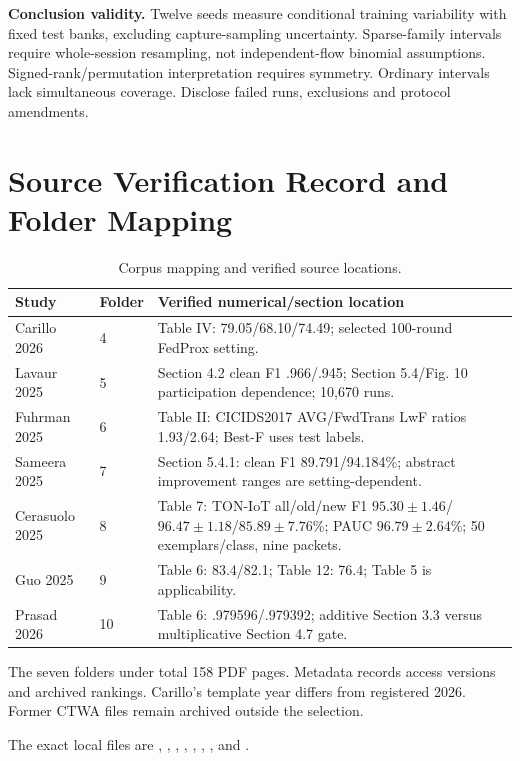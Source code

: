 \documentclass[10pt,a4paper]{article}
\begin{document}
\textbf{Conclusion validity.} Twelve seeds measure conditional training variability with fixed test banks, excluding capture-sampling uncertainty. Sparse-family intervals require whole-session resampling, not independent-flow binomial assumptions. Signed-rank/permutation interpretation requires symmetry. Ordinary intervals lack simultaneous coverage. Disclose failed runs, exclusions and protocol amendments.

\appendix
\section{Source Verification Record and Folder Mapping}
\label{app:sources}
\begin{table}[htbp]
\centering\footnotesize
\caption{Corpus mapping and verified source locations.}
\label{tab:mapping}
\begin{tabularx}{\linewidth}{L{2.4cm}L{1.0cm}Y}
\toprule
Study & Folder & Verified numerical/section location\\
\midrule
Carillo 2026 & 4 & Table IV: 79.05/68.10/74.49; selected 100-round FedProx setting.\\
Lavaur 2025 & 5 & Section 4.2 clean F1 .966/.945; Section 5.4/Fig. 10 participation dependence; 10,670 runs.\\
Fuhrman 2025 & 6 & Table II: CICIDS2017 AVG/FwdTrans LwF ratios 1.93/2.64; Best-F uses test labels.\\
Sameera 2025 & 7 & Section 5.4.1: clean F1 89.791/94.184\%; abstract improvement ranges are setting-dependent.\\
Cerasuolo 2025 & 8 & Table 7: TON-IoT all/old/new F1 $95.30\pm1.46$/$96.47\pm1.18$/$85.89\pm7.76$\%; PAUC $96.79\pm2.64$\%; 50 exemplars/class, nine packets.\\
Guo 2025 & 9 & Table 6: 83.4/82.1; Table 12: 76.4; Table 5 is applicability.\\
Prasad 2026 & 10 & Table 6: .979596/.979392; additive Section 3.3 versus multiplicative Section 4.7 gate.\\
\bottomrule
\end{tabularx}
\end{table}
The seven folders under  total 158 PDF pages. Metadata records access versions and archived rankings. Carillo's template year differs from registered 2026. Former CTWA files remain archived outside the selection.

The exact local files are , , , , , , , and .
\end{document}
